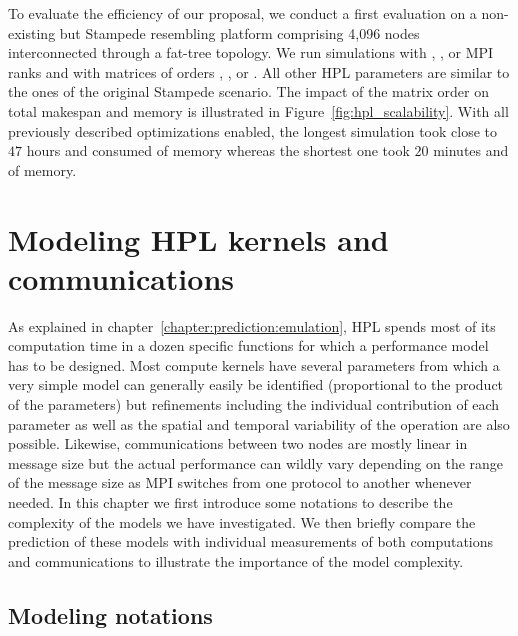         To evaluate the efficiency of our proposal, we conduct a first evaluation on a non-existing but Stampede
        resembling platform comprising 4,096 nodes interconnected through a fat-tree topology.
        We run simulations with , ,  or  MPI ranks and with matrices of orders
        , ,  or . All other HPL parameters are similar to the ones of the original
        Stampede scenario.  The impact of the matrix order on total makespan and memory is illustrated in
        Figure~\ref{fig:hpl_scalability}.  With all previously described optimizations enabled, the longest simulation
        took close to \(47\) hours and consumed  of memory whereas the shortest one took \(20\)
        minutes and  of memory.

\chapter{Modeling HPL kernels and communications}%
\label{chapter:prediction:modeling}

    As explained in chapter~\ref{chapter:prediction:emulation}, HPL spends most of its computation time in a dozen specific
    functions for which a performance model has to be designed. Most compute kernels have several parameters from which
    a very simple model can generally easily be identified (\eg proportional to the product of the parameters) but
    refinements including the individual contribution of each parameter as well as the spatial and temporal variability
    of the operation are also possible. Likewise, communications between two nodes are mostly linear in message size but
    the actual performance can wildly vary depending on the range of the message size as MPI switches from one
    protocol to another whenever needed. In this chapter we first introduce some notations to describe the complexity of
    the models we have investigated. We then briefly compare the prediction of these models with individual measurements
    of both computations and communications to illustrate the importance of the model complexity.

    \section{Modeling notations}%

